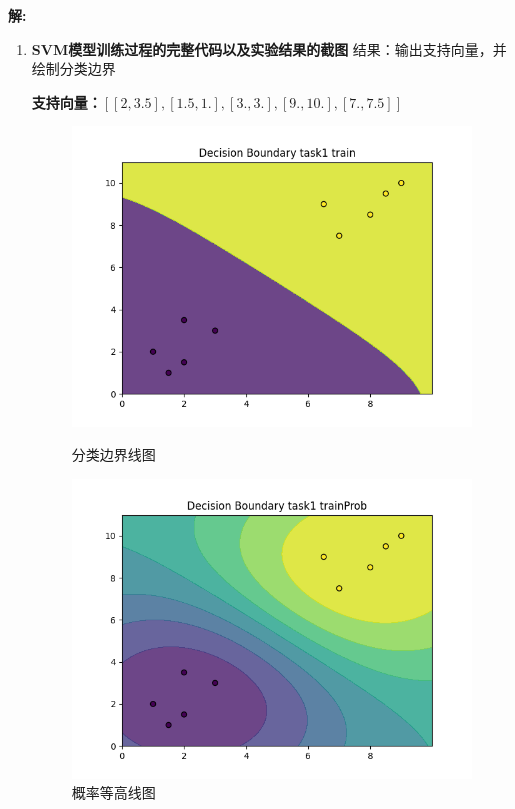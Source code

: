 \documentclass[8pt]{article}
\begin{document}
\textbf{\large 解:}
    \textbf{\color{red}{代码见 Prob2; 输出见 Prob2/Out}}
\begin{enumerate}
    \item \textbf{SVM模型训练过程的完整代码以及实验结果的截图} 结果：输出支持向量，并绘制分类边界

    \textbf{支持向量：\([
    [ 2, 3.5],
    [1.5, 1.],
    [ 3.,   3. ],
    [ 9.,  10. ],
    [ 7.,  7.5]]\)
    }
    \begin{figure}[H]
    \centering
    \begin{minipage}{0.45\textwidth}
        \centering
        \includegraphics[width=\textwidth]{HW03/Prob2/out/task1/decision_boundary_train.png}
        \caption{分类边界线图}
        \label{fig:decision_boundary_train}
    \end{minipage}
    \hfill
    \begin{minipage}{0.45\textwidth}
        \centering
        \includegraphics[width=\textwidth]{HW03/Prob2/out/task1/decision_boundary_trainProb.png}
        \caption{概率等高线图}
        \label{fig:decision_boundary_trainProb}
    \end{minipage}
    \hfill
\end{figure}
    

\end{enumerate}
\end{document}

